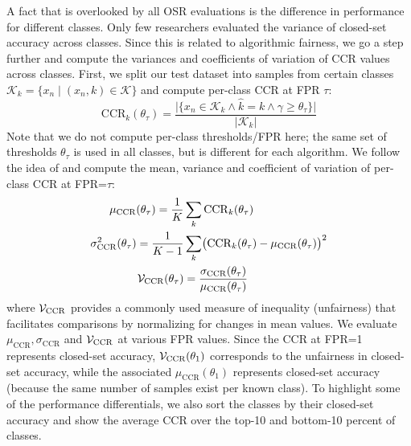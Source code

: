 A fact that is overlooked by all OSR evaluations is the difference in performance for different classes.
Only few researchers evaluated the variance of closed-set accuracy across classes.
Since this is related to algorithmic fairness, we go a step further and compute the variances and coefficients of variation of CCR values across classes.
First, we split our test dataset into samples from certain classes $\mathcal K_k = \{x_n\mid (x_n,k) \in \mathcal K\}$ and compute per-class CCR at FPR $\tau$:
\begin{equation}
  \label{eq:per-class}
  \mathrm{CCR}_k(\theta_\tau) = \frac{\bigl|\{x_n \in \mathcal K_k \wedge \hat k = k \wedge \gamma \geq \theta_\tau \}\bigr|}{|\mathcal K_k|}
\end{equation}
Note that we do not compute per-class thresholds/FPR here;  the same set of thresholds $\theta_\tau$ is used in all classes, but is different for each algorithm.
We follow the idea of \citet{atkinson1970measurement,formby1999coefficient,xinying2023guide} and compute the mean,  variance and coefficient of variation of per-class CCR at FPR=$\tau$:
\begin{equation}
    \begin{aligned}
    \label{eq:variation}
    \mu_{\mathrm{CCR}}(\theta_\tau) = \frac1K &\sum\limits_k \mathrm{CCR}_k (\theta_\tau)\\ 
    \sigma^2_{\mathrm{CCR}}(\theta_\tau) = \frac1{K-1} &\sum\limits_k \bigl(\mathrm{CCR}_k(\theta_\tau) - \mu_{\mathrm{CCR}}(\theta_\tau)\bigr)^2 \\
    {\cal V}_{\mathrm{CCR}}(\theta_\tau) &= \frac{\sigma_{\mathrm{CCR}}(\theta_\tau)} {\mu_{\mathrm{CCR}}(\theta_\tau)}
    \end{aligned}
\end{equation}
where ${\cal V}_{\mathrm{CCR}}$ provides a commonly used measure of inequality (unfairness) that facilitates comparisons by normalizing for changes in mean values.
We evaluate $\mu_{\mathrm{CCR}}, \sigma_{\mathrm{CCR}}$ and ${\cal V}_{\mathrm{CCR}}$ at various FPR values. 
Since the CCR at FPR=1 represents closed-set accuracy, ${\cal V}_{\mathrm{CCR}}(\theta_1)$ corresponds to the unfairness in closed-set accuracy, while the associated $\mu_{\mathrm{CCR}}(\theta_1)$ represents closed-set accuracy (because the same number of samples exist per known class). 
To highlight some of the performance differentials, we also sort the classes by their closed-set accuracy and show the average CCR over the top-10 and bottom-10 percent of classes.


